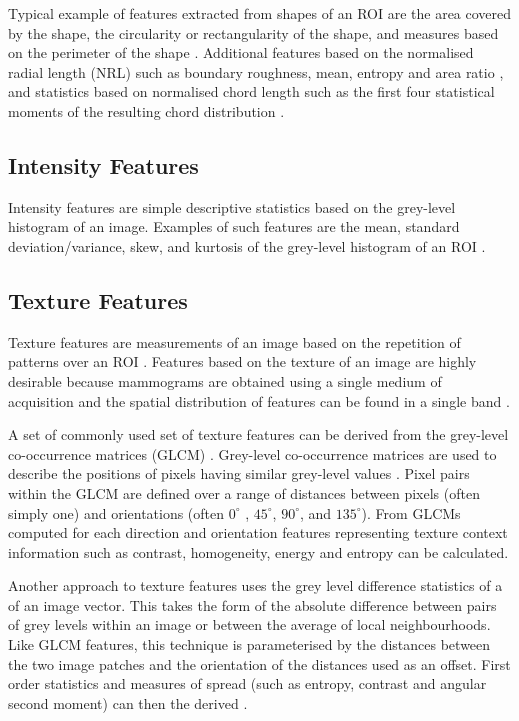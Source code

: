 Typical example of features extracted from shapes of an ROI are the area covered by the shape, the circularity or rectangularity of the shape, and measures based on the perimeter of the shape \cite{petrick1999combined}. Additional features based on the normalised radial length (NRL) \cite{kilday1993classifying} such as boundary roughness, mean, entropy and area ratio \cite{petrick1999combined, petrick1996automated}, and statistics based on normalised chord length \cite{you1984performance} such as the first four statistical  moments of the resulting chord distribution \cite{el1996shape}.

\subsection{Intensity Features}
Intensity features are simple descriptive statistics based on the grey-level histogram of an image. Examples of such features are the mean, standard deviation/variance, skew, and kurtosis of the grey-level histogram of an ROI \cite{cheng2006approaches, christoyianni2000fast}.

\subsection{Texture Features}
Texture features are measurements of an image based on the repetition of patterns over an ROI \cite{parker2010algorithms}. Features based on the texture of an image are highly desirable because mammograms are obtained using a single medium of acquisition and the spatial distribution of features can be found in a single band \cite{ganesan2013computer}.

A set of commonly used set of texture features can be derived from the grey-level co-occurrence matrices (GLCM) \cite{haralick1973textural}. Grey-level co-occurrence matrices are used to describe the positions of pixels having similar grey-level values \cite{parker2010algorithms}. Pixel pairs within the GLCM are defined over a range of distances between pixels (often simply one) and orientations (often $0^\circ$ , $45^\circ$, $90^\circ$, and $135^\circ$). From GLCMs computed for each direction and orientation features representing texture context information such as  contrast, homogeneity, energy and entropy \cite{haralick1973textural, cheng2006approaches, parker2010algorithms} can be calculated.

Another approach to texture features uses the grey level difference statistics of a of an image vector. This takes the form of the absolute difference between pairs of grey levels within an image or between the average of local neighbourhoods. Like GLCM features, this technique is parameterised by the distances between the two image patches and the orientation of the distances used as an offset. First order statistics and measures of spread (such as entropy, contrast and angular second moment) can then the derived \cite{weszka1976comparative}.

